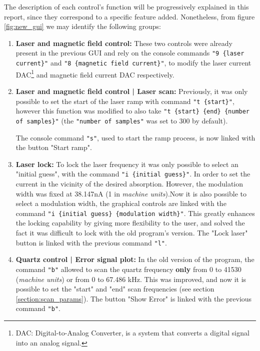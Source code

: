 \documentclass[a4paper,12pt]{article}
\begin{document}
The description of each control's function will be progressively explained in this report, since they correspond to a specific feature added. Nonetheless, from figure \ref{fig:new_gui} we may identify the following groups:

\begin{enumerate}[wide, labelwidth=!, labelindent=0pt]
	\item \textbf{Laser and magnetic field control:} \newline These two controls were already present in the previous GUI and rely on the console commands \texttt{"9 \{laser current\}"} and  \texttt{"8 \{magnetic field current\}"}, to modify the laser current DAC\footnote{DAC: Digital-to-Analog Converter, is a system that converts a digital signal into an analog signal.} and magnetic field current DAC respectively. %
	
	\item \textbf{Laser and magnetic field control | Laser scan:} \newline Previously, it was only possible to set the start of the laser ramp with command \mbox{\texttt{"t \{start\}"}}, however this function was modified to also take \mbox{\texttt{"t \{start\} \{end\} \{number of samples\}"}} \break(the \texttt{"number of samples"} was set to 300 by default).
	
	The console command \texttt{"s"}, used to start the ramp process, is now linked with the button "Start ramp".
	\item \textbf{Laser lock:} \newline To lock the laser frequency it was only possible to select an "initial guess", with the command \mbox{\texttt{"i \{initial guess\}"}}. In order to set the current in the vicinity of the desired absorption. However, the modulation width was fixed at 38.147nA (1 in \textit{machine units}).\newline Now it is also possible to select a modulation width, the graphical controls are linked with the command \mbox{\texttt{"i \{initial guess\} \{modulation width\}"}}. This greatly enhances the locking capability by giving more flexibility to the user, and solved the fact it was difficult to lock with the old program's version. %
	\newline The "Lock laser" button is linked with the previous command \texttt{"l"}.
 	\item \textbf{Quartz control | Error signal plot:} \newline In the old version of the program, the command \texttt{"b"} allowed to scan the quartz frequency \textbf{only} from 0 to 41530 (\textit{machine units}) or from 0 to 67.486 kHz. This was improved, and now it is possible to set the "start" and "end" scan frequencies (see section \ref{section:scan_params}).
 	\newline The button "Show Error" is linked with the previous command \texttt{"b"}.
\end{enumerate}
\endgroup
\end{document}
